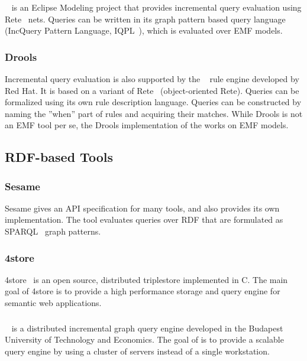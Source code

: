 \subsubsection{\eiq{}}
\eiq{}~\cite{models10} is an Eclipse Modeling project that provides incremental query evaluation using Rete~\cite{rete} nets. Queries can be written in its graph pattern based query language (IncQuery Pattern Language, IQPL~\cite{iqpl}), which is evaluated over EMF models.

\subsubsection{Drools}
Incremental query evaluation is also supported by the ~\cite{Drools} rule engine developed by Red Hat. It is based on a variant of Rete~\cite{rete} (object-oriented Rete). Queries can be formalized using its own rule description language. Queries can be constructed by naming the ''when'' part of rules and acquiring their matches. While Drools is not an EMF tool per se, the Drools implementation of the \tb{} works on EMF models.


\subsection{RDF-based Tools}

\subsubsection{Sesame}
Sesame gives an API specification for many tools, and also provides its own implementation. The tool evaluates queries over RDF that are formulated as SPARQL~\cite{Sparql} graph patterns.

\subsubsection{4store}
4store~\cite{harris20094store} is an open source, distributed triplestore implemented in C. The main goal of 4store is to provide a high performance storage and query engine for semantic web applications. 

\subsubsection{\iqd}
\iqd{}~\cite{Izso:2013:IIG:2487766.2487772} is a distributed incremental graph query engine developed in the Budapest University of Technology and Economics. The goal of \iqd{} is to provide a scalable query engine by using a cluster of servers instead of a single workstation.



